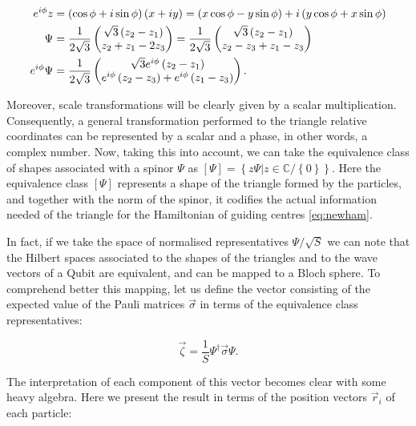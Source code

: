 \begin{align*}
e^{i\phi}z &= \left( \cos{\phi}+i\sin{\phi} \right)\left( x+iy \right) = \left( x\cos{\phi}-y\sin{\phi} \right) + i\left( y\cos{\phi}+x\sin{\phi} \right)\\
\Psi &= \frac{1}{2\sqrt{3}}\begin{pmatrix}\sqrt{3}\left( z_{2}-z_{1} \right)\\
z_{2}+z_{1}-2z_{3}\end{pmatrix}=\frac{1}{2\sqrt{3}}\begin{pmatrix}\sqrt{3}\left( z_{2}-z_{1} \right)\\
z_{2}-z_3+ z_{1}-z_{3}\end{pmatrix}\\
e^{i\phi}\Psi &= \frac{1}{2\sqrt{3}}\begin{pmatrix}\sqrt{3}e^{i\phi}\left( z_{2}-z_{1} \right)\\
e^{i\phi}\left( z_{2}-z_3 \right)+ e^{i\phi}\left( z_{1}-z_{3} \right)\end{pmatrix}.
\end{align*}

Moreover, scale transformations will be clearly given by a scalar multiplication. Consequently, a general transformation performed to the triangle relative coordinates can be represented by a scalar and a phase, in other words, a complex number. Now, taking this into account, we can take the equivalence class of shapes associated with a spinor $\Psi$ as $\left[ \Psi \right] = \left\{ z\Psi | z \in \mathbb{C} / \left\{ 0 \right\} \right\}$. Here the equivalence class $\left[ \Psi \right]$ represents a shape of the triangle formed by the particles, and together with the norm of the spinor, it codifies the actual information needed of the triangle for the Hamiltonian of guiding centres \eqref{eq:newham}. 

In fact, if we take the space of normalised representatives $\Psi/\sqrt{S}$ we can note that the Hilbert spaces associated to the shapes of the triangles and to the wave vectors of a Qubit are equivalent, and can be mapped to a Bloch sphere. To comprehend better this mapping, let us define the vector consisting of the expected value of the Pauli matrices $\vec{\sigma}$ in terms of the equivalence class representatives:

\begin{equation}
\vec{\zeta} = \frac{1}{S} \Psi^{\dagger}\vec{\sigma}\Psi.
\end{equation}

The interpretation of each component of this vector becomes clear with some heavy algebra. Here we present the result in terms of the position vectors $ \vec{r}_i $ of each particle:

